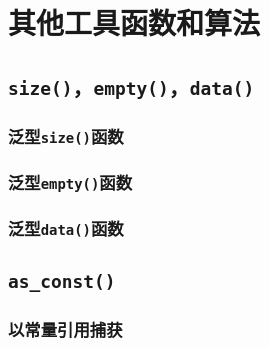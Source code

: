 \section{其他工具函数和算法}\label{ch25}

\subsection{\texttt{size()}，\texttt{empty()}，\texttt{data()}}

\subsubsection{泛型\texttt{size()}函数}

\subsubsection{泛型\texttt{empty()}函数}

\subsubsection{泛型\texttt{data()}函数}

\subsection{\texttt{as\_const()}}

\subsubsection{以常量引用捕获}\label{ch25.2.1}